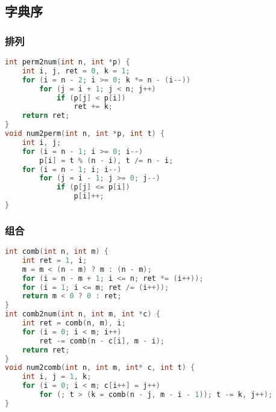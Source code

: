 \subsection{字典序}
	\subsubsection{排列}
		\begin{lstlisting}[language=c++]
int perm2num(int n, int *p) {
    int i, j, ret = 0, k = 1;
    for (i = n - 2; i >= 0; k *= n - (i--))
        for (j = i + 1; j < n; j++)
            if (p[j] < p[i])
                ret += k;
    return ret;
}
void num2perm(int n, int *p, int t) {
    int i, j;
    for (i = n - 1; i >= 0; i--)
        p[i] = t % (n - i), t /= n - i;
    for (i = n - 1; i; i--)
        for (j = i - 1; j >= 0; j--)
            if (p[j] <= p[i])
                p[i]++;
}
		\end{lstlisting}
	\subsubsection{组合}
		\begin{lstlisting}[language=c++]
int comb(int n, int m) {
    int ret = 1, i;
    m = m < (n - m) ? m : (n - m);
    for (i = n - m + 1; i <= n; ret *= (i++));
    for (i = 1; i <= m; ret /= (i++));
    return m < 0 ? 0 : ret;
}
int comb2num(int n, int m, int *c) {
    int ret = comb(n, m), i;
    for (i = 0; i < m; i++)
        ret -= comb(n - c[i], m - i);
    return ret;
}
void num2comb(int n, int m, int* c, int t) {
    int i, j = 1, k;
    for (i = 0; i < m; c[i++] = j++)
        for (; t > (k = comb(n - j, m - i - 1)); t -= k, j++);
}
		\end{lstlisting}